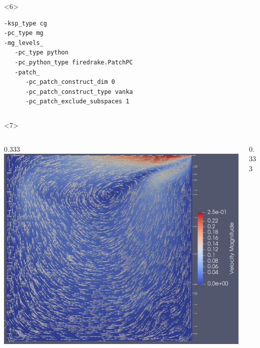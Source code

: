 \documentclass[presentation,aspectratio=43, 10pt]{beamer}
\begin{document}
\begin{frame}[fragile, t]
\begin{overlayarea}{\textwidth}{0.52\textheight}
\begin{onlyenv}
\begin{columns}[T]
\begin{column}{0.6\textwidth}
\begin{onlyenv}
\begin{verbatim}
\end{verbatim}
        \end{onlyenv}
        \begin{onlyenv}<6>
\begin{verbatim}
-ksp_type cg
-pc_type mg
-mg_levels_
   -pc_type python
   -pc_python_type firedrake.PatchPC
   -patch_
      -pc_patch_construct_dim 0
      -pc_patch_construct_type vanka
      -pc_patch_exclude_subspaces 1
\end{verbatim}
        \end{onlyenv}
      \end{column}
    \end{columns}
  \end{onlyenv}
  \begin{onlyenv}<7>
    \begin{columns}
      \begin{column}{0.333\pagewidth}
        \includegraphics[width=\textwidth]{stokes-velocity}
      \end{column}
      \begin{column}{0.333\pagewidth}

\end{column}
\end{columns}
\end{onlyenv}
\end{overlayarea}
\end{frame}
\end{document}
